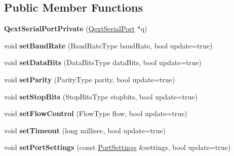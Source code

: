 \subsection*{Public Member Functions}
\begin{DoxyCompactItemize}
\item 
\mbox{\label{class_qext_serial_port_private_a12fad88c1276b3b2c092e3a5de77f9bb}} 
{\bfseries Qext\+Serial\+Port\+Private} (\mbox{\hyperlink{class_qext_serial_port}{Qext\+Serial\+Port}} $\ast$q)
\item 
\mbox{\label{class_qext_serial_port_private_ac61ce4856fe5ad06b200a7465a91beb6}} 
void {\bfseries set\+Baud\+Rate} (Baud\+Rate\+Type baud\+Rate, bool update=true)
\item 
\mbox{\label{class_qext_serial_port_private_adf91a225f33c1d61fa83bb02e946b0ca}} 
void {\bfseries set\+Data\+Bits} (Data\+Bits\+Type data\+Bits, bool update=true)
\item 
\mbox{\label{class_qext_serial_port_private_a1f107a3cd902b3b771b0b3fd48da9345}} 
void {\bfseries set\+Parity} (Parity\+Type parity, bool update=true)
\item 
\mbox{\label{class_qext_serial_port_private_a4046f6246e0c1e85ef7ace991b4d422b}} 
void {\bfseries set\+Stop\+Bits} (Stop\+Bits\+Type stopbits, bool update=true)
\item 
\mbox{\label{class_qext_serial_port_private_affe9d4b79195e9eac1ac2d9b432dbdbf}} 
void {\bfseries set\+Flow\+Control} (Flow\+Type flow, bool update=true)
\item 
\mbox{\label{class_qext_serial_port_private_ab76757ab539aed54650ac77acef48c9d}} 
void {\bfseries set\+Timeout} (long millisec, bool update=true)
\item 
\mbox{\label{class_qext_serial_port_private_ae7a798b17387ccdf346ac12d061a02af}} 
void {\bfseries set\+Port\+Settings} (const \mbox{\hyperlink{struct_port_settings}{Port\+Settings}} \&settings, bool update=true)

\end{DoxyCompactItemize}
